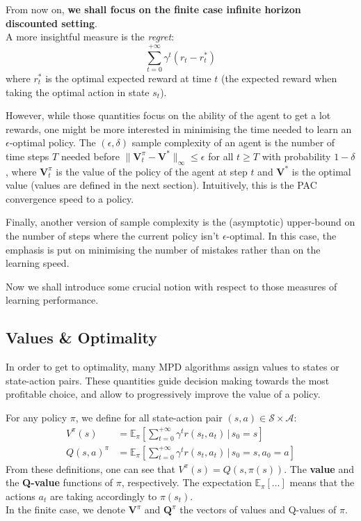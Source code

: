 From now on, \textbf{we shall focus on the finite case infinite horizon discounted setting}.\\[1.5\lineskip]

A more insightful measure is the \emph{regret}: $$\sum_{t=0}^{+\infty} \gamma^t(r_t - r_t^*)$$where $r_t^*$ is the optimal expected reward at time $t$ (the expected reward when taking the optimal action in state $s_t$).

However, while those quantities focus on the ability of the agent to get a lot rewards, one might be more interested in minimising the time needed to learn an $\epsilon$-optimal policy. The $(\epsilon, \delta)$ sample complexity of an agent is the number of time steps $T$ needed before $\| \mathbf{V}_t^\pi - \mathbf{V}^* \|_\infty \leq \epsilon$ for all $t \geq T$ with probability $1 - \delta$, where $\mathbf{V}_t^\pi$ is the value of the policy of the agent at step $t$ and $\mathbf{V}^*$ is the optimal value (values are defined in the next section). Intuitively, this is the PAC convergence speed to a policy.

Finally, another version of sample complexity is the (asymptotic) upper-bound on the number of steps where the current policy isn't $\epsilon$-optimal. In this case, the emphasis is put on minimising the number of mistakes rather than on the learning speed.

Now we shall introduce some crucial notion with respect to those measures of learning performance.

\subsection{Values \& Optimality}
\label{subsec:MDP-values}

In order to get to optimality, many MPD algorithms assign values to states or state-action pairs. These quantities guide decision making towards the most profitable choice, and allow to progressively improve the value of a policy.

\begin{defi}
  For any policy $\pi$, we define for all state-action pair $(s, a) \in \mathcal{S}\times \mathcal{A}$:
  \begin{align*}
  V^\pi(s) &= \mathbb{E}_\pi \left[\sum_{t=0}^{+\infty} \gamma^t r(s_t, a_t) \,|\, s_0=s \right]\\
  Q(s, a)^\pi &= \mathbb{E}_\pi \left[\sum_{t=0}^{+\infty} \gamma^t r(s_t, a_t) \,|\, s_0=s, a_0=a \right]
  \end{align*}
  From these definitions, one can see that $V^\pi(s) = Q(s, \pi(s))$.
  The \textbf{value} and the \textbf{Q-value} functions of $\pi$, respectively. The expectation $\mathbb{E}_\pi[\dots]$ means that the actions $a_t$ are taking accordingly to $\pi(s_t)$.\\
  In the finite case, we denote $\mathbf{V}^\pi$ and $\mathbf{Q}^\pi$ the vectors of values and Q-values of $\pi$.
\end{defi}

